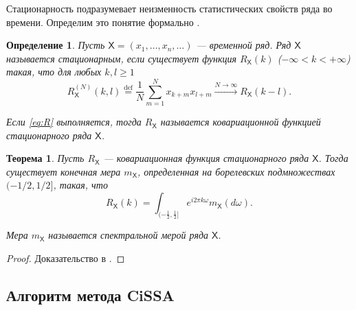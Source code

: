 \documentclass[a4paper, 11pt]{article}
\newcommand{\TS}{\mathsf{X}}
\newtheorem{definition}{Определение} %
\newtheorem{theorem}{Теорема} %
\begin{document}
Стационарность подразумевает неизменность статистических свойств ряда во времени. Определим это понятие формально \cite{golyandina2001analysis}.
\begin{definition}
	Пусть $\TS = (x_1, \dots, x_n, \dots)$ — временной ряд. Ряд $\TS$ называется стационарным, если существует функция $R_{\TS}(k)$ ($-\infty < k < +\infty$) такая, что для любых $k, l \geq 1$
	\begin{equation}
		R_{\TS}^{(N)}(k, l) \overset{\mathrm{def}}{=} \frac{1}{N} \sum_{m=1}^{N} x_{k+m} x_{l+m} \xrightarrow{N \to \infty} R_{\TS}(k - l). \label{eq:R}
	\end{equation}

	Если \eqref{eq:R} выполняется, тогда $R_{\TS}$ называется ковариационной функцией стационарного ряда $\TS$.
\end{definition}

\begin{theorem}
	Пусть $R_{\TS}$ — ковариационная функция стационарного ряда $\TS$. Тогда существует конечная мера $m_{\TS}$, определенная на борелевских подмножествах $(-1/2, 1/2]$, такая, что
	\[
		R_{\TS}(k) = \int_{(-\frac{1}{2}, \frac{1}{2}]} e^{i 2 \pi k \omega} m_{\TS}(d\omega).
	\]


	Мера $m_{\TS}$ называется спектральной мерой ряда $\TS$.
\end{theorem}
\begin{proof}
	Доказательство в \cite{golyandina2001analysis}.
\end{proof}


\subsection{Алгоритм метода CiSSA}
\end{document}
